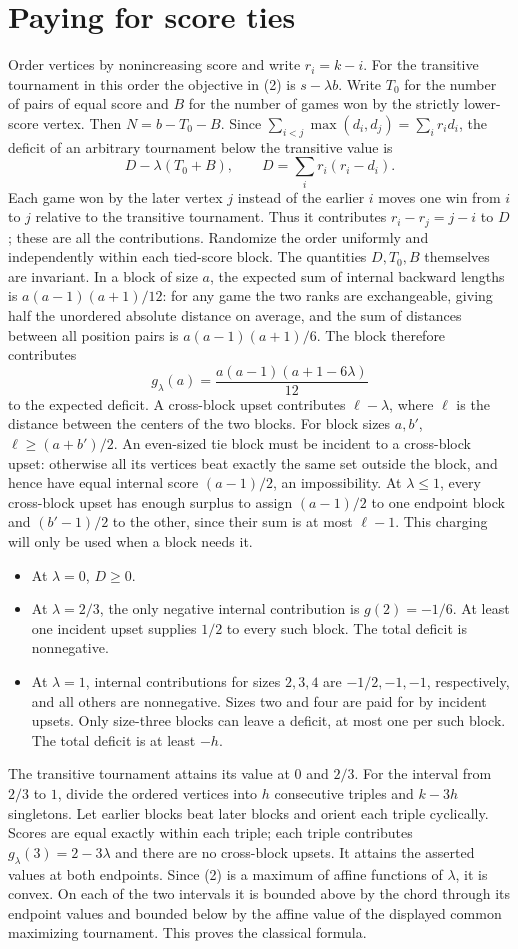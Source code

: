 \documentclass[11pt]{article}
\begin{document}
\section{Paying for score ties}
Order vertices by nonincreasing score and write $r_i=k-i$. For the transitive tournament in this order the objective in (2) is $s-\lambda b$. Write $T_0$ for the number of pairs of equal score and $B$ for the number of games won by the strictly lower-score vertex. Then $N=b-T_0-B$. Since $\sum_{i<j}\max(d_i,d_j)=\sum_i r_i d_i$, the deficit of an arbitrary tournament below the transitive value is
\[
 D-\lambda(T_0+B),\qquad D=\sum_i r_i(r_i-d_i).
\]
Each game won by the later vertex $j$ instead of the earlier $i$ moves one win from $i$ to $j$ relative to the transitive tournament. Thus it contributes $r_i-r_j=j-i$ to $D$; these are all the contributions. Randomize the order uniformly and independently within each tied-score block. The quantities $D,T_0,B$ themselves are invariant. In a block of size $a$, the expected sum of internal backward lengths is $a(a-1)(a+1)/12$: for any game the two ranks are exchangeable, giving half the unordered absolute distance on average, and the sum of distances between all position pairs is $a(a-1)(a+1)/6$. The block therefore contributes
\[
 g_\lambda(a)=\frac{a(a-1)(a+1-6\lambda)}{12}
\]
to the expected deficit. A cross-block upset contributes $\ell-\lambda$, where $\ell$ is the distance between the centers of the two blocks. For block sizes $a,b'$, $\ell\ge(a+b')/2$.
An even-sized tie block must be incident to a cross-block upset: otherwise all its vertices beat exactly the same set outside the block, and hence have equal internal score $(a-1)/2$, an impossibility. At $\lambda\le1$, every cross-block upset has enough surplus to assign $(a-1)/2$ to one endpoint block and $(b'-1)/2$ to the other, since their sum is at most $\ell-1$. This charging will only be used when a block needs it.
\begin{itemize}
\item At $\lambda=0$, $D\ge0$.
\item At $\lambda=2/3$, the only negative internal contribution is $g(2)=-1/6$. At least one incident upset supplies $1/2$ to every such block. The total deficit is nonnegative.
\item At $\lambda=1$, internal contributions for sizes $2,3,4$ are $-1/2,-1,-1$, respectively, and all others are nonnegative. Sizes two and four are paid for by incident upsets. Only size-three blocks can leave a deficit, at most one per such block. The total deficit is at least $-h$.
\end{itemize}
The transitive tournament attains its value at $0$ and $2/3$. For the interval from $2/3$ to $1$, divide the ordered vertices into $h$ consecutive triples and $k-3h$ singletons. Let earlier blocks beat later blocks and orient each triple cyclically. Scores are equal exactly within each triple; each triple contributes $g_\lambda(3)=2-3\lambda$ and there are no cross-block upsets. It attains the asserted values at both endpoints. Since (2) is a maximum of affine functions of $\lambda$, it is convex. On each of the two intervals it is bounded above by the chord through its endpoint values and bounded below by the affine value of the displayed common maximizing tournament. This proves the classical formula.
\end{document}
